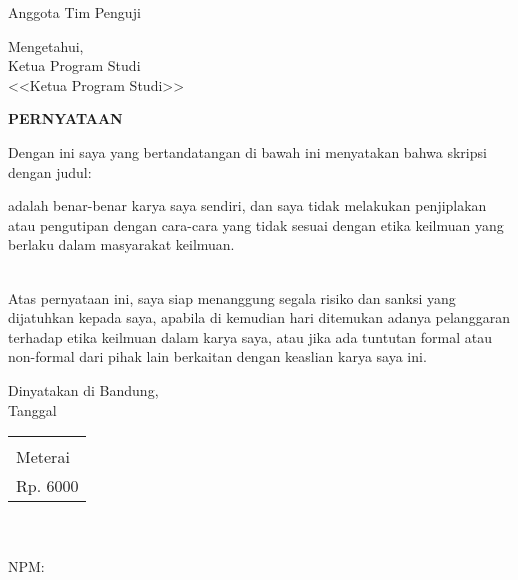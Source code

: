 \documentclass[11pt,a4paper,twoside,openright,notitlepage]{report}
\newcommand{\rtext}[1]{{\color{red} \small #1}}%
\newcommand{\vstaINA}{\rtext{SKRIPSI}}
\newcommand{\vkaprodi}{\rtext{<<Ketua Program Studi>>}}
\begin{document}
{{{\begin{center}
{{\begin{center}
\begin{minipage}[b]{0.475\textwidth}
				\begin{center}Anggota Tim Penguji \\ \vspace{2.5cm} \vpengii\end{center} 
			\end{minipage} 
		\end{center}
		\vspace{0.75cm}
		\begin{center} 
		Mengetahui,\\ \vspace{0.5cm}	
		Ketua Program Studi \\ \vspace{2.5cm} \vkaprodi
		\end{center}
		}}			 
	\end{center}
	\cleardoublepage 
	
	\vspace*{4cm}
	\begin{center} 
		{\Large \textbf{PERNYATAAN}\\} \vspace{1cm}
	\end{center}
	{\noindent Dengan ini saya yang bertandatangan di bawah ini menyatakan bahwa \MakeLowercase{\vstaINA} dengan judul:  \vspace{0.5cm}
	\begin{center} {\large \textbf{\vjudulINA}}\end{center}
	\vspace{0.5cm}
	adalah benar-benar karya saya sendiri, dan saya tidak melakukan penjiplakan atau pengutipan dengan cara-cara yang tidak sesuai dengan etika keilmuan yang berlaku dalam masyarakat keilmuan.}
	\vspace{0pt}\\
	{\noindent			
	Atas pernyataan ini, saya siap menanggung segala risiko dan sanksi yang dijatuhkan kepada saya, apabila di kemudian hari ditemukan adanya pelanggaran terhadap etika keilmuan dalam karya saya, atau jika ada tuntutan formal atau non-formal dari pihak lain berkaitan dengan keaslian karya saya ini.\\}
	\vspace{0.25cm}
	
	\begin{flushright}	
		Dinyatakan di Bandung,\\
		Tanggal \vtanggal\ \vbulan\ \vtahun \\ \vspace{0.5cm}
		\begin{tabular}{|p{1.75cm}|}
			\hline\\ Meterai \\ Rp. 6000 \\  \hline
		\end{tabular}\\
		\vspace{0.5cm}   
		\vnama \\
		NPM: \vnpm
	\end{flushright}
	 \cleardoublepage 

}}}
\end{document}
